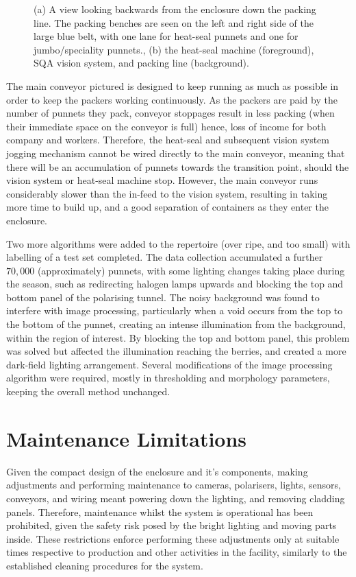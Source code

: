 \documentclass[fleqn,twoside,12pt]{report}
\begin{document}
\begin{figure}[ht]
	\caption{(a) A view looking backwards from the enclosure down the packing line. The packing benches are seen on the left and right side of the large blue belt, with one lane for heat-seal punnets and one for jumbo/speciality punnets., (b) the heat-seal machine (foreground), SQA vision system, and packing line (background).}
	\label{}
\end{figure}

The main conveyor pictured is designed to keep running as much as possible in order to keep the packers working continuously. As the packers are paid by the number of punnets they pack, conveyor stoppages result in less packing (when their immediate space on the conveyor is full) hence, loss of income for both company and workers. Therefore, the heat-seal and subsequent vision system jogging mechanism cannot be wired directly to the main conveyor, meaning that there will be an accumulation of punnets towards the transition point, should the vision system or heat-seal machine stop. However, the main conveyor runs considerably slower than the in-feed to the vision system, resulting in taking more time to build up, and a good separation of containers as they enter the enclosure.

Two more algorithms were added to the repertoire (over ripe, and too small) with labelling of a test set completed. The data collection accumulated a further $70,000$ (approximately) punnets, with some lighting changes taking place during the season, such as redirecting halogen lamps upwards and blocking the top and bottom panel of the polarising tunnel. The noisy background was found to interfere with image processing, particularly when a void occurs from the top to the bottom of the punnet, creating an intense illumination from the background, within the region of interest. By blocking the top and bottom panel, this problem was solved but affected the illumination reaching the berries, and created a more dark-field lighting arrangement. Several modifications of the image processing algorithm were required, mostly in thresholding and morphology parameters, keeping the overall method unchanged. 



\section{Maintenance Limitations}
\label{sec:maintenance}

Given the compact design of the enclosure and it's components, making adjustments and performing maintenance to cameras, polarisers, lights, sensors, conveyors, and wiring meant powering down the lighting, and removing cladding panels. Therefore, maintenance whilst the system is operational has been prohibited, given the safety risk posed by the bright lighting and moving parts inside. These restrictions enforce performing these adjustments only at suitable times respective to production and other activities in the facility, similarly to the established cleaning procedures for the system. 
\end{document}
